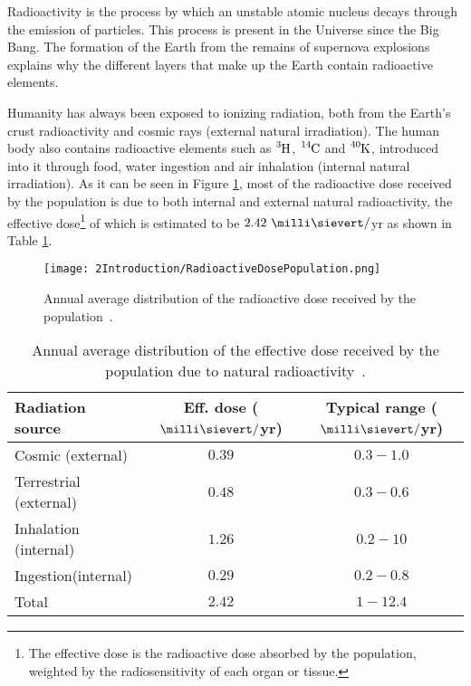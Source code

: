 Radioactivity is the process by which an unstable atomic nucleus decays through the emission of particles. This process is present in the Universe since the Big Bang. The formation of the Earth from the remains of supernova explosions explains why the different layers that make up the Earth contain radioactive elements. 

Humanity has always been exposed to ionizing radiation, both from the Earth's crust radioactivity and cosmic rays (external natural irradiation). The human body also contains radioactive elements such as $\ce{^{3}H}$, $\ce{^{14}C}$ and $\ce{^{40}K}$, introduced into it through food, water ingestion and air inhalation (internal natural irradiation). As it can be seen in Figure \ref{fig:RadioactiveDosePopulation}, most of the radioactive dose received by the population is due to both internal and external natural radioactivity, the effective dose\footnote{The effective dose is the radioactive dose absorbed by the population, weighted by the radiosensitivity of each organ or tissue.} of which is estimated to be $2.42~\milli\sievert/$yr as shown in Table \ref{tab:RadioactiveNaturalDosePopulation}. 

\begin{figure}[h]
\texttt{[image: 2Introduction/RadioactiveDosePopulation.png]}
\centering
\caption{Annual average distribution of the radioactive dose received by the population~\cite{IAEA}\label{fig:RadioactiveDosePopulation}.}
\end{figure}

\begin{table}[h]
\centering{}%
\begin{tabular}{lcc}
\toprule 
Radiation source & Eff. dose ($\milli\sievert/$yr) & Typical range ($\milli\sievert/$yr)\tabularnewline
\midrule
\midrule 
Cosmic (external) & $0.39$ & $0.3 - 1.0$ \tabularnewline
Terrestrial (external) & $0.48$ & $0.3-0.6$ \tabularnewline  
Inhalation (internal) & $1.26$ & $0.2-10$ \tabularnewline
Ingestion(internal) & $0.29$ & $0.2-0.8$ \tabularnewline
\midrule
Total & $2.42$ & $1-12.4$ \tabularnewline
\bottomrule
\end{tabular}
\caption{Annual average distribution of the effective dose received by the population due to natural radioactivity~\cite{UNSCEAR, CSN}.}
\label{tab:RadioactiveNaturalDosePopulation}
\end{table}

